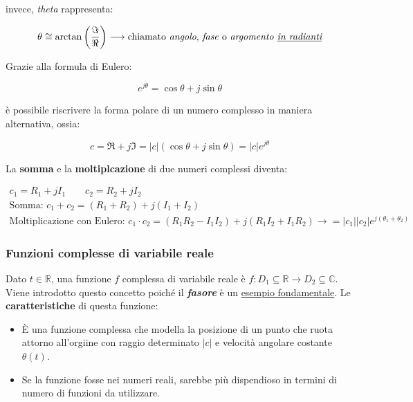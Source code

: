 \documentclass[a4paper]{article}
\begin{document}
	\noindent
	invece, \emph{theta} rappresenta:
	
	\begin{equation*}
		\theta \cong \arctan{\left(\dfrac{\Im}{\Re}\right)} \longrightarrow \text{chiamato \emph{angolo}, \emph{fase} o \emph{argomento \underline{in radianti}}}
	\end{equation*}

	Grazie alla formula di Eulero:
	
	\begin{equation*}
		e^{j \theta} = \cos{\theta} + j \sin{\theta}
	\end{equation*}
	
	\noindent
	è possibile riscrivere la forma polare di un numero complesso in maniera alternativa, ossia:
	
	\begin{equation*}
		c = \Re + j \Im = |c|\left(\cos{\theta} + j \sin{\theta}\right) = |c| e^{j \theta}
	\end{equation*}

	La \textbf{somma} e la \textbf{moltiplcazione} di due numeri complessi diventa:
	
	\begin{gather*}
		c_1 = R_1 + j I_1 \hspace{2em} c_2 = R_2 + j I_2 \\
		\text{Somma: } c_1 + c_2 = \left(R_1 + R_2\right) + j \left(I_1 + I_2\right) \\
		\text{Moltiplicazione con Eulero: } c_1\cdot c_2 = \left(R_1 R_2 - I_1 I_2\right) + j \left(R_1 I_2 + I_1 R_2\right) \longrightarrow = |c_1| |c_2| e^{j\left(\theta_1 + \theta_2\right)}
	\end{gather*}

	\newpage

	\subsubsection{Funzioni complesse di variabile reale}

	Dato $t \in \mathbb{R}$, una funzione $f$ complessa di variabile reale è $f: D_1 \subseteq \mathbb{R} \rightarrow D_2 \subseteq \mathbb{C}$. Viene introdotto questo concetto poiché il \textbf{\emph{fasore}} è un \underline{esempio fondamentale}. Le \textbf{caratteristiche} di questa funzione:
	
	\begin{itemize}
		\item È una funzione complessa che modella la posizione di un punto che ruota attorno all'orgiine con raggio determinato $|c|$ e velocità angolare costante $\theta{(t)}$.
		
		\item Se la funzione fosse nei numeri reali, sarebbe più dispendioso in termini di numero di funzioni da utilizzare.
	\end{itemize}
	
\end{document}

